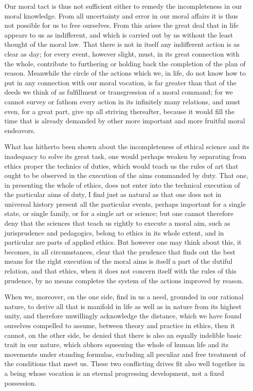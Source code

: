 \documentclass[12pt,a4paper,openany]{book}
\newcommand{\opage}[1]{\marginnote{\footnotesize\textit{[#1]}}}
\begin{document}
Our moral tact is thus not sufficient either to remedy the incompleteness in our
moral knowledge. From all uncertainty and error in our moral affairs it is thus not
possible for us to free ourselves. From this arises the great deal that in life
appears to us as indifferent, and which is carried out by us without the least
thought of the moral law. That there is not in itself any indifferent action is as
clear as day; for every event, however slight, must, in its great connection with
the whole, contribute to furthering or holding back the completion of the plan of
reason. Meanwhile the circle of the actions which we, in life, do not know how to put
in any connection with our moral vocation, is far greater than that of the deeds we
think of as fulfillment or transgression of a moral command; for we cannot survey or
fathom every action in its infinitely many relations, and must even, for a great
part, give up all striving thereafter, because it would fill the time that is already
demanded by other more important and more fruitful moral endeavors.

What has hitherto been shown about the incompleteness of ethical science and its
inadequacy to solve its great task, one would perhaps weaken by separating from
ethics proper the technics of duties, which would teach us the rules of art that
ought to be observed in the execution of the aims commanded by duty. That one, in
presenting the whole of ethics, does not enter into the technical execution of the
particular aims of duty, I find just as natural as that one does not in universal
history present all the particular events, perhaps important for a single state, or
single family, or for a single art or science; but one cannot therefore deny that the
sciences that teach us rightly to execute a moral aim, such as jurisprudence and
pedagogics, belong to
\setcounter{footnote}{0}%
\opage{98}ethics in its whole extent, and in particular are parts of applied ethics. But
however one may think about this, it becomes, in all circumstances, clear that the
prudence that finds out the best means for the right execution of the moral aims is
itself a part of the dutiful relation, and that ethics, when it does not concern
itself with the rules of this prudence, by no means completes the system of the
actions improved by reason.

When we, moreover, on the one side, find in us a need, grounded in our rational
nature, to derive all that is manifold in life as well as in nature from its highest
unity, and therefore unwillingly acknowledge the distance, which we have found
ourselves compelled to assume, between theory and practice in ethics, then it cannot,
on the other side, be denied that there is also an equally indelible basic trait in
our nature, which abhors squeezing the whole of human life and its movements under
standing formulas, excluding all peculiar and free treatment of the conditions that
meet us. These two conflicting drives fit also well together in a being whose
vocation is an eternal progressing development, not a fixed possession.
\end{document}
